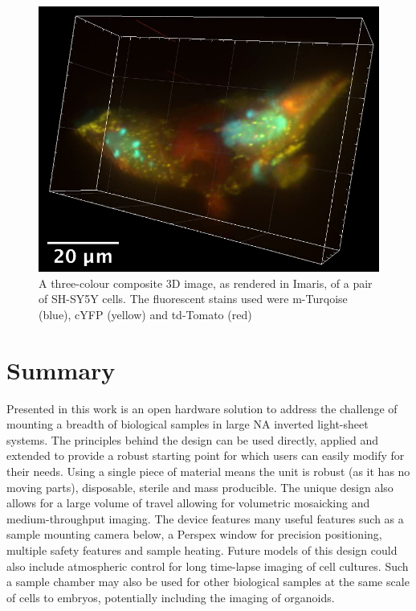 \begin{figure}
    \centering
    \includegraphics[width=0.8\linewidth]{./cell_image}
    \caption{A three-colour composite 3D image, as rendered in Imaris, of a pair of \gls{SH-SY5Y} cells.
    The fluorescent stains used were m-Turqoise (blue), cYFP (yellow) and td-Tomato (red)}
    \label{fig:cell_image}
\end{figure}

\section{Summary}

Presented in this work is an open hardware solution to address the challenge of mounting a breadth of biological samples in large \gls{NA} inverted light-sheet systems.
The principles behind the design can be used directly, applied and extended to provide a robust starting point for which users can easily modify for their needs.
Using a single piece of  material means the unit is robust (as it has no moving parts), disposable, sterile and mass producible.
The unique design also allows for a large volume of travel allowing for volumetric mosaicking and medium-throughput imaging.
The device features many useful features such as a sample mounting camera below, a Perspex window for precision positioning, multiple safety features and sample heating.
Future models of this design could also include atmospheric control for long time-lapse imaging of cell cultures.
Such a sample chamber may also be used for other biological samples at the same scale of cells to embryos, potentially including the imaging of \gls{organoid}s.


